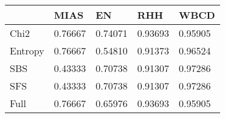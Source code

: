 \begin{tabular}{|l|l|l|l|l|}
\toprule
{} &    MIAS &      EN &     RHH &    WBCD \\
\midrule
Chi2    & 0.76667 & 0.74071 & 0.93693 & 0.95905 \\
Entropy & 0.76667 & 0.54810 & 0.91373 & 0.96524 \\
SBS     & 0.43333 & 0.70738 & 0.91307 & 0.97286 \\
SFS     & 0.43333 & 0.70738 & 0.91307 & 0.97286 \\
Full    & 0.76667 & 0.65976 & 0.93693 & 0.95905 \\
\bottomrule
\end{tabular}
